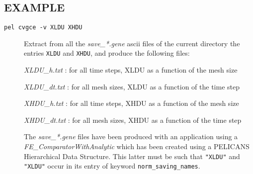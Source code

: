 \documentclass{article}
\begin{document}
\subsection*{EXAMPLE\label{cvgce_EXAMPLE}}
\begin{description}

\item[\texttt{pel cvgce -v XLDU XHDU}] \mbox{}

Extract from all the \emph{save\_*.gene} ascii files of the current directory
the entries \texttt{XLDU} and \texttt{XHDU}, and produce the following files:



\emph{XLDU\_h.txt} : for all time steps, XLDU as a function of the mesh size



\emph{XLDU\_dt.txt} : for all mesh sizes, XLDU as a function of the time step



\emph{XHDU\_h.txt} : for all time steps, XHDU as a function of the mesh size



\emph{XHDU\_dt.txt} : for all mesh sizes, XHDU as a function of the time step



The \emph{save\_*.gene} files have been produced with an application using
a \emph{FE\_ComparatorWithAnalytic} which has been created using a PELICANS
Hierarchical Data Structure. This latter must be such that \texttt{"XLDU"}
and \texttt{"XLDU"} occur in its entry of keyword \texttt{norm\_saving\_names}.

\end{description}
\printindex
\end{document}
